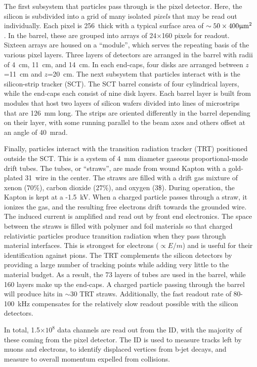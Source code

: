 The first subsystem that particles pass through is the pixel detector.
Here, the silicon is subdivided into a grid of many isolated \emph{pixels} that may be read out individually.
Each pixel is 256~\um thick with a typical surface area of $\sim50\times400\upmu\text{m}^2$.
In the barrel, these are grouped into arrays of 24$\times$160 pixels for readout.
Sixteen arrays are housed on a ``module'', which serves the repeating basis of the various pixel layers.
Three layers of detectors are arranged in the barrel with radii of 4~cm, 11~cm, and 14~cm.
In each end-caps, four disks are arranged between $z$=11~cm and $z$=20~cm.
\cite{pixel}
The next subsystem that particles interact with is the silicon-strip tracker (SCT).
The SCT barrel consists of four cylindrical layers, while the end-caps each consist of nine disk layers.
Each barrel layer is built from modules that host two layers of silicon wafers divided into lines of microstrips that are 126~mm long.
The strips are oriented differently in the barrel depending on their layer, with some running parallel to the beam axes and others offset at an angle of 40~mrad. \cite{sct}

Finally, particles interact with the transition radiation tracker (TRT) positioned outside the SCT.
This is a system of 4~mm diameter gaseous proportional-mode drift tubes.
The tubes, or ``straws'', are made from wound Kapton with a gold-plated 31~\um wire in the center.
The straws are filled with a drift gas mixture of xenon (70\%), carbon dioxide (27\%), and oxygen (3\$).
During operation, the Kapton is kept at a -1.5~kV.
When a charged particle passes through a straw, it ionizes the gas, and the resulting free electrons drift towards the grounded wire.
The induced current is amplified and read out by front end electronics.
The space between the straws is filled with polymer and foil materials so that charged relativistic particles produce transition radiation when they pass through material interfaces.
This is strongest for electrons ($\propto E/m$) and is useful for their identification against pions.
The TRT complements the silicon detectors by providing a large number of tracking points while adding very little to the material budget.
As a result, the 73 layers of tubes are used in the barrel, while 160 layers make up the end-caps.
A charged particle passing through the barrel will produce hits in $\sim30$ TRT straws.
Additionally, the fast readout rate of 80-100~kHz compensates for the relatively slow readout possible with the silicon detectors.
\cite{trt}

In total, 1.5$\times10^{8}$ data channels are read out from the ID, with the majority of these coming from the pixel detector.
The ID is used to measure tracks left by muons and electrons, to identify displaced vertices from b-jet decays, and measure to overall momentum expelled from collisions.

